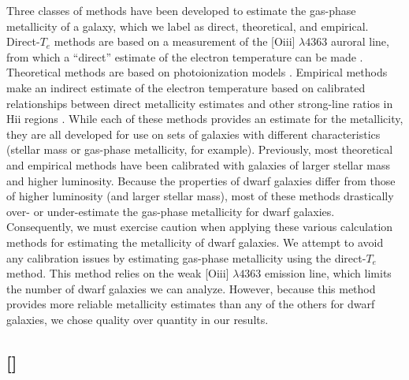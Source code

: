 Three classes of methods have been developed to estimate the gas-phase 
metallicity of a galaxy, which we label as direct, theoretical, and empirical.  
Direct-$T_e$ methods are based on a measurement of the [O{\sc iii}] 
$\lambda 4363$ auroral line, from which a ``direct'' estimate of the electron 
temperature can be made \citep[e.g.,][]{Izotov06, Kniazev08, Pilyugin07, Yin07}.  
Theoretical methods are based on photoionization models 
\citep[e.g.,][]{Kewley02}.  Empirical methods make an indirect estimate of the 
electron temperature based on calibrated relationships between direct 
metallicity estimates and other strong-line ratios in H{\sc ii} regions 
\citep[see, for example,][]{Pettini04, Pilyugin11, Dopita13, LaraLopez13, 
Marino13}.  While each of these methods provides an estimate for the 
metallicity, they are all developed for use on sets of galaxies with different 
characteristics (stellar mass or gas-phase metallicity, for example).  
Previously, most theoretical and empirical methods have been calibrated with 
galaxies of larger stellar mass and higher luminosity.  Because the properties 
of dwarf galaxies differ from those of higher luminosity (and larger stellar 
mass), most of these methods drastically over- or under-estimate the gas-phase 
metallicity for dwarf galaxies.  Consequently, we must exercise caution when 
applying these various calculation methods for estimating the metallicity of 
dwarf galaxies.  We attempt to avoid any calibration issues by estimating 
gas-phase metallicity using the direct-$T_e$ method.  This method relies on the 
weak [O{\sc iii}] $\lambda 4363$ emission line, which limits the number of dwarf 
galaxies we can analyze.  However, because this method provides more reliable 
metallicity estimates than any of the others for dwarf galaxies, we chose 
quality over quantity in our results.

\subsection{[]}\label{sec:O3}

